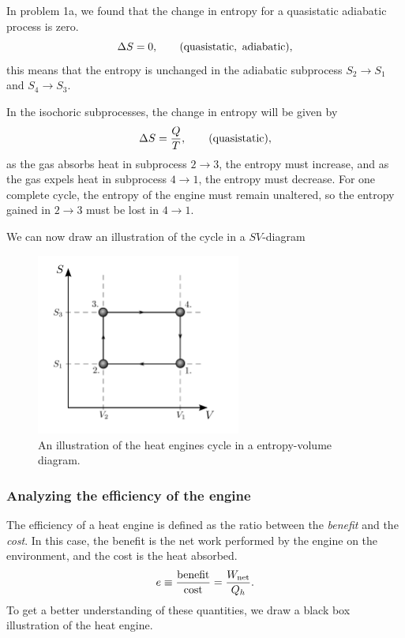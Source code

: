 \documentclass[a4paper, 11pt, titlepage, english]{article}
\begin{document}
In problem 1a, we found that the change in entropy for a quasistatic adiabatic process is zero.
$$\Delta S = 0, \qquad {\rm (quasistatic,\ adiabatic)},$$
this means that the entropy is unchanged in the adiabatic subprocess $S_2 \rightarrow S_1$ and $S_4 \rightarrow S_3$.

In the isochoric subprocesses, the change in entropy will be given by
$$\Delta S = \frac{Q}{T}, \qquad {\rm (quasistatic)},$$
as the gas absorbs heat in subprocess $2 \rightarrow 3$, the entropy must increase, and as the gas expels heat in subprocess $4 \rightarrow 1$,  the entropy must decrease. For one complete cycle, the entropy of the engine must remain unaltered, so the entropy gained in $2\rightarrow3$ must be lost in $4\rightarrow1$.

We can now draw an illustration of the cycle in a $SV$-diagram
\begin{figure}[htbp]
\centering
\includegraphics[width=0.6\textwidth]{SV}
\caption{An illustration of the heat engines cycle in a entropy-volume diagram.} \label{fig:SV}
\end{figure}

\subsubsection*{Analyzing the efficiency of the engine}

The efficiency of a heat engine is defined as the ratio between the {\it benefit} and the {\it cost}. In this case, the benefit is the net work performed by the engine on the environment, and the cost is the heat absorbed.
$$e \equiv  \frac{\rm benefit}{\rm cost} = \frac{W_{\rm net}}{Q_h}.$$
To get a better understanding of these quantities, we draw a black box illustration of the heat engine.
\end{document}
